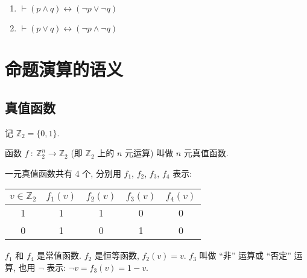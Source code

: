 \documentclass[
    mode=hazy,
    color=blue,
    device=normal,
    lang=cn
]{elegantnote}
\begin{document}
\begin{proposition}[De. Morgan 律]
    \begin{enumerate}[label=$\arabic*^\circ$]
        \item $\vdash (p\land q)\leftrightarrow (\lnot p\lor \lnot q)$
        \item $\vdash (p\lor q)\leftrightarrow (\lnot p\land \lnot q)$
    \end{enumerate}
\end{proposition}
\section{命题演算的语义}
\subsection{真值函数}
记 $\mathbb{Z}_2=\{0,1\}$.
\begin{definition}[真值函数]
    函数 $f\ :\ \mathbb{Z}_2^n\to\mathbb{Z}_2$ (即 $\mathbb{Z}_2$ 上的 $n$ 元运算) 叫做 $n$ 元真值函数.
\end{definition}
\begin{example}[一元真值函数]
    一元真值函数共有 4 个, 分别用 $f_1$, $f_2$, $f_3$, $f_4$ 表示:
    \begin{center}
        \begin{tabular}{c|cccc}
            $v\in\mathbb{Z}_2$ & $f_1(v)$ & $f_2(v)$ & $f_3(v)$ & $f_4(v)$ \\
            \hline
            1                  & 1        & 1        & 0        & 0        \\
            0                  & 1        & 0        & 1        & 0
        \end{tabular}
    \end{center}
    $f_1$ 和 $f_4$ 是常值函数.
    $f_2$ 是恒等函数, $f_2(v)=v$.
    $f_3$ 叫做 ``非'' 运算或 ``否定'' 运算, 也用 $\lnot$ 表示: $\lnot v=f_3(v)=1-v$.
\end{example}
\end{document}
